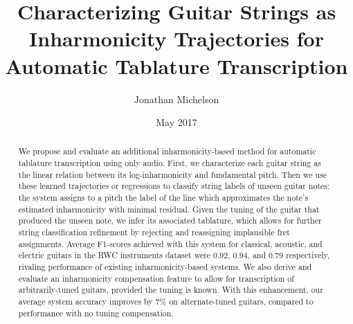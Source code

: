 \documentclass[12pt]{cmuthesis}
\begin{document}
 
\frontmatter

\pagestyle{empty}

\title{ %
{\bf Characterizing Guitar Strings as Inharmonicity Trajectories for Automatic Tablature Transcription}}
\author{Jonathan Michelson}
\date{May 2017}
\trnumber{}


\support{}
\disclaimer{}



\maketitle


\pagestyle{plain} %


\begin{abstract}
We propose and evaluate an additional inharmonicity-based method for automatic tablature transcription using only audio. First, we characterize each guitar string as the linear relation between its log-inharmonicity and fundamental pitch. Then we use these learned trajectories or regressions to classify string labels of unseen guitar notes: the system assigns to a pitch the label of the line which approximates the note's estimated inharmonicity with minimal residual. Given the tuning of the guitar that produced the unseen note, we infer its associated tablature, which allows for further string classification refinement by rejecting and reassigning implausible fret assignments. Average F1-scores achieved with this system for classical, acoustic, and electric guitars in the RWC instruments dataset were $0.92$, $0.94$, and $0.79$ respectively, rivaling performance of existing inharmonicity-based systems. We also derive and evaluate an inharmonicity compensation feature to allow for transcription of arbitrarily-tuned guitars, provided the tuning is known. With this enhancement, our average system accuracy improves by $7\%$ on alternate-tuned guitars, compared to performance with no tuning compensation.

\end{abstract}
\end{document}
